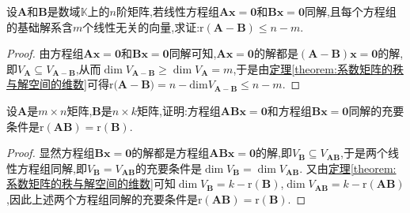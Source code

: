 \documentclass[../../main.tex]{subfiles}%
\begin{document}
\begin{example}
设\(\boldsymbol{A}\)和\(\boldsymbol{B}\)是数域\(\mathbb{K}\)上的\(n\)阶矩阵,若线性方程组\(\boldsymbol{A}\boldsymbol{x}=\boldsymbol{0}\)和\(\boldsymbol{B}\boldsymbol{x}=\boldsymbol{0}\)同解,且每个方程组的基础解系含\(m\)个线性无关的向量,求证:\(\mathrm{r}(\boldsymbol{A}-\boldsymbol{B})\leqslant  n - m\).
\end{example}
\begin{proof}
由方程组\(\boldsymbol{A}\boldsymbol{x}=\boldsymbol{0}\)和\(\boldsymbol{B}\boldsymbol{x}=\boldsymbol{0}\)同解可知,\(\boldsymbol{A}\boldsymbol{x}=\boldsymbol{0}\)的解都是\((\boldsymbol{A}-\boldsymbol{B})\boldsymbol{x}=\boldsymbol{0}\)的解,即\(V_{\boldsymbol{A}}\subseteq V_{\boldsymbol{A}-\boldsymbol{B}}\),从而\(\dim V_{\boldsymbol{A}-\boldsymbol{B}}\geqslant \dim V_{\boldsymbol{A}} = m\),于是由\hyperref[theorem:系数矩阵的秩与解空间的维数]{定理\ref{theorem:系数矩阵的秩与解空间的维数}}可得$\mathrm{r(}\boldsymbol{A}-\boldsymbol{B})=n-\mathrm{dim}V_{\boldsymbol{A}-\boldsymbol{B}}\leqslant n-m$.
\end{proof}

\begin{proposition}\label{proposition:ABx=O与Bx=O同解的充要条件}
设\(\boldsymbol{A}\)是\(m\times n\)矩阵,\(\boldsymbol{B}\)是\(n\times k\)矩阵,证明:方程组\(\boldsymbol{A}\boldsymbol{B}\boldsymbol{x}=\boldsymbol{0}\)和方程组\(\boldsymbol{B}\boldsymbol{x}=\boldsymbol{0}\)同解的充要条件是\(\mathrm{r}(\boldsymbol{A}\boldsymbol{B})=\mathrm{r}(\boldsymbol{B})\).
\end{proposition}
\begin{proof}
显然方程组\(\boldsymbol{B}\boldsymbol{x}=\boldsymbol{0}\)的解都是方程组\(\boldsymbol{A}\boldsymbol{B}\boldsymbol{x}=\boldsymbol{0}\)的解,即\(V_{\boldsymbol{B}}\subseteq V_{\boldsymbol{A}\boldsymbol{B}}\),于是两个线性方程组同解,即\(V_{\boldsymbol{B}} = V_{\boldsymbol{A}\boldsymbol{B}}\)的充要条件是\(\dim V_{\boldsymbol{B}}=\dim V_{\boldsymbol{A}\boldsymbol{B}}\). 又由\hyperref[theorem:系数矩阵的秩与解空间的维数]{定理\ref{theorem:系数矩阵的秩与解空间的维数}}可知\(\dim V_{\boldsymbol{B}}=k - \mathrm{r}(\boldsymbol{B})\),\(\dim V_{\boldsymbol{A}\boldsymbol{B}}=k - \mathrm{r}(\boldsymbol{A}\boldsymbol{B})\),因此上述两个方程组同解的充要条件是\(\mathrm{r}(\boldsymbol{A}\boldsymbol{B})=\mathrm{r}(\boldsymbol{B})\). 
\end{proof}
\end{document}
